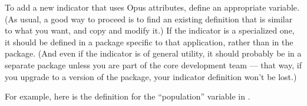 To add a new indicator \indicatorsindex that uses Opus attributes,
\attributesindex define an appropriate variable. \variablesindex (As usual,
a good way to proceed is to find an existing definition that is similar to
what you want, and copy and modify it.)  If the indicator \indicatorsindex
is a specialized one, it should be defined in a package specific to that
application, rather than in the  package.  (And even if
the indicator \indicatorsindex is of general utility, it should probably be
in a separate package unless you are part of the core development team ---
that way, if you upgrade to a version of the  package,
your indicator \indicatorsindex definition won't be lost.)

For example, here is the definition for the ``population'' variable
\variablesindex in .

